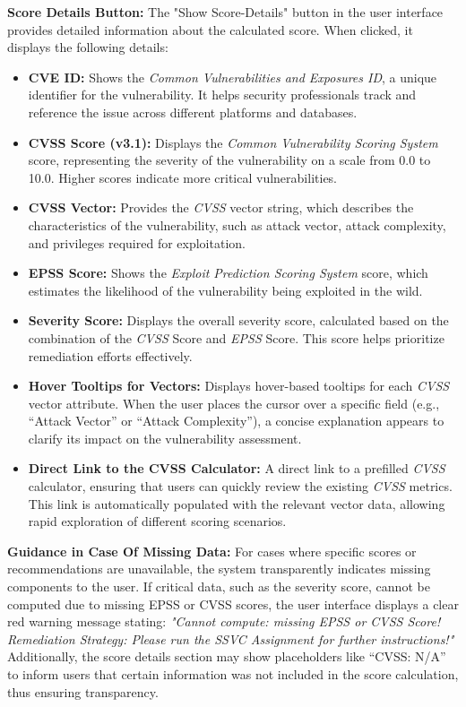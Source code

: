 \textbf{Score Details Button:} The "Show Score-Details" button in the user interface provides detailed information about the calculated score. When clicked, it displays the following details:
    \begin{itemize}
        \item \textbf{\ac{CVE} ID:} Shows the \textit{Common Vulnerabilities and Exposures ID}, a unique identifier for the vulnerability. It helps security professionals track and reference the issue across different platforms and databases.
        \item \textbf{\ac{CVSS} Score (v3.1):} Displays the \textit{Common Vulnerability Scoring System} score, representing the severity of the vulnerability on a scale from 0.0 to 10.0. Higher scores indicate more critical vulnerabilities.
        \item \textbf{\ac{CVSS} Vector:} Provides the \textit{\ac{CVSS}} vector string, which describes the characteristics of the vulnerability, such as attack vector, attack complexity, and privileges required for exploitation.
        \item \textbf{\ac{EPSS} Score:} Shows the \textit{Exploit Prediction Scoring System} score, which estimates the likelihood of the vulnerability being exploited in the wild.
        \item \textbf{Severity Score:} Displays the overall severity score, calculated based on the combination of the \textit{\ac{CVSS}} Score and \textit{\ac{EPSS}} Score. This score helps prioritize remediation efforts effectively.
        \item \textbf{Hover Tooltips for Vectors:}  
        Displays hover-based tooltips for each \textit{\ac{CVSS}} vector attribute. When the user places the cursor over a specific field (e.g., “Attack Vector” or “Attack Complexity”), a concise explanation appears to clarify its impact on the vulnerability assessment.
        \item \textbf{Direct Link to the CVSS Calculator:}  
        A direct link to a prefilled \textit{\ac{CVSS}} calculator, ensuring that users can quickly review the existing \textit{\ac{CVSS}} metrics. This link is automatically populated with the relevant vector data, allowing rapid exploration of different scoring scenarios.
    \end{itemize}

\textbf{Guidance in Case Of Missing Data:}
\label{guidance-missing-data}
For cases where specific scores or recommendations are unavailable, the system transparently indicates missing components to the user. If critical data, such as the severity score, cannot be computed due to missing \ac{EPSS} or \ac{CVSS} scores, the user interface displays a clear red warning message stating: \textit{"Cannot compute: missing \ac{EPSS} or \ac{CVSS} Score! Remediation Strategy: Please run the \ac{SSVC} Assignment for further instructions!"} Additionally, the score details section may show placeholders like “\ac{CVSS}: N/A” to inform users that certain information was not included in the score calculation, thus ensuring transparency.

